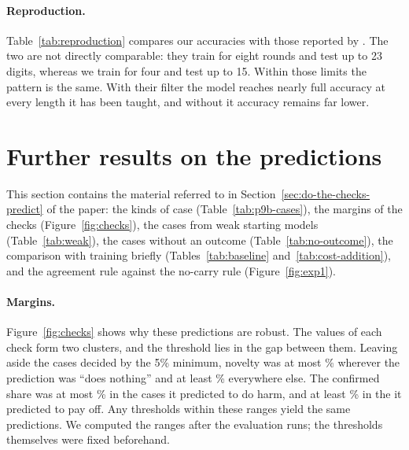 \paragraph{Reproduction.}
Table~\ref{tab:reproduction} compares our accuracies with those reported by
\citet{shin2026compositional}. The two are not directly comparable: they
train for eight rounds and test up to 23 digits, whereas we train for four
and test up to 15. Within those limits the pattern is the same. With their
filter the model reaches nearly full accuracy at every length it has been
taught, and without it accuracy remains far lower.




\section{Further results on the predictions}
\label{app:prediction}

This section contains the material referred to in
Section~\ref{sec:do-the-checks-predict} of the paper: the kinds of case
(Table~\ref{tab:p9b-cases}), the margins of the checks
(Figure~\ref{fig:checks}), the cases from weak starting models
(Table~\ref{tab:weak}), the cases without an outcome
(Table~\ref{tab:no-outcome}), the comparison with training briefly
(Tables~\ref{tab:baseline} and~\ref{tab:cost-addition}), and the agreement
rule against the no-carry rule
(Figure~\ref{fig:exp1}).



\paragraph{Margins.}
Figure~\ref{fig:checks} shows why these predictions are robust. The values of
each check form two clusters, and the threshold lies in the gap between them.
Leaving aside the cases decided by the 5\% minimum, novelty was at most
\gpNoveltyMarginLow\% wherever the prediction was ``does nothing'' and at
least \gpNoveltyMarginHigh\% everywhere else. The confirmed share was at most
\gpConfirmedMarginLow\% in the \gpConfirmedHarmCases{} cases it predicted to
do harm, and at least \gpConfirmedMarginHigh\% in the \gpConfirmedPaysCases{}
it predicted to pay off. Any thresholds within these ranges yield the same
predictions. We computed the ranges after the evaluation runs; the
thresholds themselves were fixed beforehand.



